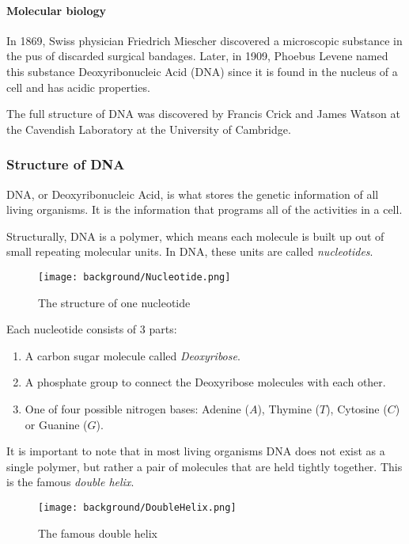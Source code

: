 \paragraph{Molecular biology}

In 1869, Swiss physician Friedrich Miescher discovered a microscopic substance in the pus of discarded surgical bandages. Later, in 1909, Phoebus Levene named this substance Deoxyribonucleic Acid (DNA) since it is found in the nucleus of a cell and has acidic properties.

The full structure of DNA was discovered by Francis Crick and James Watson at the Cavendish Laboratory at the University of Cambridge.

\subsubsection{Structure of DNA}

DNA, or Deoxyribonucleic Acid, is what stores the genetic information of all living organisms. It is the information that programs all of the activities in a cell.

Structurally, DNA is a polymer, which means each molecule is built up out of small repeating molecular units. In DNA, these units are called \emph{nucleotides}.

\begin{figure}[!ht]
	\centering
	\texttt{[image: background/Nucleotide.png]}
	\caption{The structure of one nucleotide}
	\label{fig:nucleotide}
\end{figure}

Each nucleotide consists of 3 parts:

\begin{enumerate}
	\item A carbon sugar molecule called \emph{Deoxyribose}.
	\item A phosphate group to connect the Deoxyribose molecules with each other. 
	\item One of four possible nitrogen bases: Adenine ($A$), Thymine ($T$), Cytosine ($C$) or Guanine ($G$).
\end{enumerate}

It is important to note that in most living organisms DNA does not exist as a single polymer, but rather a pair of molecules that are held tightly together. This is the famous \emph{double helix}.

\begin{figure}[!ht]
	\centering
	\texttt{[image: background/DoubleHelix.png]}
	\caption{The famous double helix}
	\label{fig:doubleHelix}
\end{figure}

